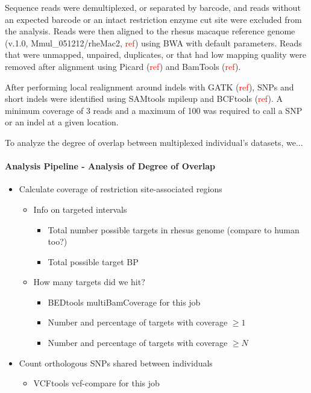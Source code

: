 \documentclass[12pt]{article}
\begin{document}
	Sequence reads were demultiplexed, or separated by barcode, and reads without an expected barcode or an intact restriction enzyme cut site were excluded from the analysis. Reads were then aligned to the rhesus macaque reference genome (v.1.0, Mmul\_051212/rheMac2, \textcolor{red}{ref}) using BWA with default parameters. Reads that were unmapped, unpaired, duplicates, or that had low mapping quality were removed after alignment using Picard (\textcolor{red}{ref}) and BamTools (\textcolor{red}{ref}). 

	After performing local realignment around indels with GATK (\textcolor{red}{ref}), SNPs and short indels were identified using SAMtools mpileup and BCFtools (\textcolor{red}{ref}). A minimum coverage of 3 reads and a maximum of 100 was required to call a SNP or an indel at a given location.
	
	To analyze the degree of overlap between multiplexed individual's datasets, we...

\paragraph{Analysis Pipeline - Analysis of Degree of Overlap}
\begin{itemize}
	\item Calculate coverage of restriction site-associated regions
	\begin{itemize}
		\item Info on targeted intervals
		\begin{itemize}
			\item Total number possible targets in rhesus genome (compare to human too?)
			\item Total possible target BP
		\end{itemize}
		\item How many targets did we hit?
		\begin{itemize}
			\item BEDtools multiBamCoverage for this job
			\item Number and percentage of targets with coverage $\ge 1$
			\item Number and percentage of targets with coverage $\ge N$
		\end{itemize}
	\end{itemize}
	\item Count orthologous SNPs shared between individuals
	\begin{itemize}
		\item VCFtools vcf-compare for this job
	\end{itemize}
\end{itemize}
\end{document}
